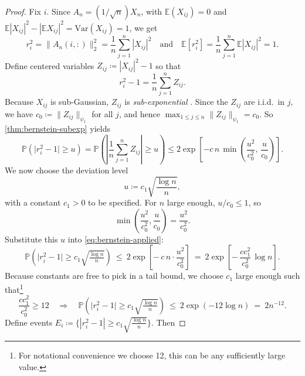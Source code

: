 \documentclass[11pt,a4paper]{article}
\newcommand{\Prob}{\mathbb{P}}
\newcommand{\E}{\mathbb{E}}
\begin{document}
\begin{proof} Fix $i$. Since $A_n=(1/\sqrt n)X_n$, with $\E(X_{ij})=0$ and $\E|X_{ij}|^2-|\E X_{ij}|^2=\text{Var}(X_{ij})=1$, we get
\begin{equation}
r_i^2=\|A_n(i,:)\|_2^2=\frac1n\sum_{j=1}^n |X_{ij}|^2
\quad\text{and}\quad
\E [r_i^2] = \frac1n\sum_{j=1}^n \E|X_{ij}|^2 = 1.
\end{equation}
Define centered variables $Z_{ij}\coloneq |X_{ij}|^2-1$ so that
\begin{equation}
r_i^2-1=\frac1n\sum_{j=1}^n Z_{ij}.
\end{equation}
Because $X_{ij}$ is sub-Gaussian, $Z_{ij}$ is \emph{sub-exponential} \cite{Vershynin2018HDP}. Since the $Z_{ij}$ are i.i.d.\ in $j$, we have $c_0\coloneq \|Z_{ij}\|_{\psi_1}$ for all $j$, and hence $\max_{1\le j\le n}\|Z_{ij}\|_{\psi_1}= c_0$. So \cref{thm:bernstein-subexp} yields
\begin{equation}\label{eq:bernstein-applied}
\Prob\!\left(\big|r_i^2-1\big|\geq u\right)
=\Prob\!\left(\left|\frac1n\sum_{j=1}^n Z_{ij}\right|\geq u\right)
\le 2\exp\!\left[-c\,n\,\min\!\left(\frac{u^2}{c_0^2},\,\frac{u}{c_0}\right)\right].
\end{equation}
We now {choose} the deviation level
\begin{equation}
u\coloneq c_1\sqrt{\frac{\log n}{n}},
\end{equation}
with a constant $c_1>0$ to be specified. For $n$ large enough, $u/c_0\le 1$, so
\begin{equation}
\min\!\left(\frac{u^2}{c_0^2},\frac{u}{c_0}\right)=\frac{u^2}{c_0^2}.
\end{equation}
Substitute this $u$ into \cref{eq:bernstein-applied}:
\begin{equation}
\Prob\!\left(\big|r_i^2-1\big|\geq c_1\sqrt{\tfrac{\log n}{n}}\right)
\ \le\ 2\exp\!\left[-\,c\,n\cdot\frac{u^2}{c_0^2}\right]
\ =\ 2\exp\!\left[-\,\frac{cc_1^2}{c_0^2}\,\log n\right].
\end{equation}
Because constants are free to pick in a tail bound, we choose $c_1$ large enough such that\footnote{For notational convenience we choose 12, this can be any sufficiently large value.} 
\begin{equation}\label{eq:b.22ref}
\frac{cc_1^2}{c_0^2}\ge 12 
\quad\Longrightarrow\quad
\Prob\!\left(\big|r_i^2-1\big|\geq c_1\sqrt{\tfrac{\log n}{n}}\right)
\ \le\ 2\exp(-12\log n)
\ =\ 2n^{-12}.
\end{equation}
Define events $E_i\coloneq \big\{|r_i^2-1|\geq c_1\sqrt{\frac{\log n}{n}}\big\}$. Then

\end{proof}
\end{document}

